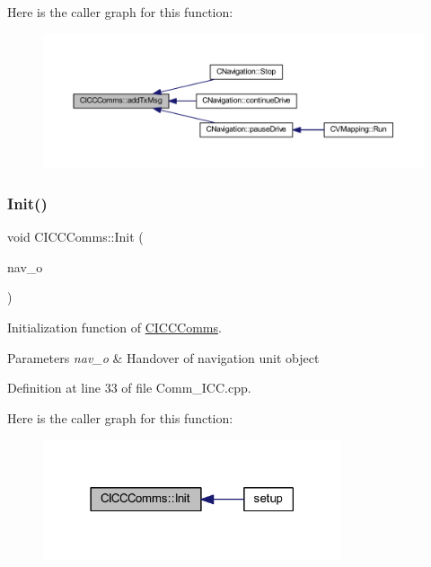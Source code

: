 Here is the caller graph for this function\+:\nopagebreak
\begin{figure}[H]
\begin{center}
\leavevmode
\includegraphics[width=350pt]{class_c_i_c_c_comms_ab925dd7ff82f30ccd9f770ab2281b3ab_icgraph}
\end{center}
\end{figure}
\mbox{\label{class_c_i_c_c_comms_ad1d35d2145363d2ab970f9f5cd1dfc23}} 
\subsubsection{\texorpdfstring{Init()}{Init()}}
{\footnotesize\ttfamily void C\+I\+C\+C\+Comms\+::\+Init (\begin{DoxyParamCaption}\item[{\mbox{\hyperlink{class_c_navigation}{C\+Navigation}} $\ast$}]{nav\+\_\+o }\end{DoxyParamCaption})\hspace{0.3cm}{\ttfamily [virtual]}}



Initialization function of \mbox{\hyperlink{class_c_i_c_c_comms}{C\+I\+C\+C\+Comms}}. 


\begin{DoxyParams}{Parameters}
{\em nav\+\_\+o} & Handover of navigation unit object \\
\hline
\end{DoxyParams}


Definition at line 33 of file Comm\+\_\+\+I\+C\+C.\+cpp.

Here is the caller graph for this function\+:\nopagebreak
\begin{figure}[H]
\begin{center}
\leavevmode
\includegraphics[width=249pt]{class_c_i_c_c_comms_ad1d35d2145363d2ab970f9f5cd1dfc23_icgraph}
\end{center}
\end{figure}
\mbox{\label{class_c_i_c_c_comms_a8b3fa81307b3b9ba0e72b4aee8279c56}} 

